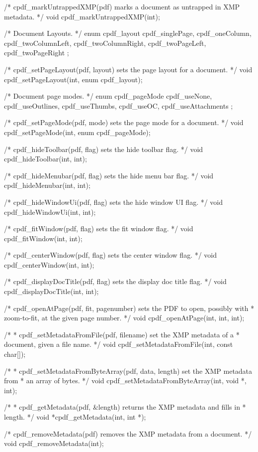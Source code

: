 /* cpdf_markUntrappedXMP(pdf) marks a document as untrapped in XMP metadata. */
void cpdf_markUntrappedXMP(int);

/* Document Layouts. */
enum cpdf_layout {
  cpdf_singlePage,
  cpdf_oneColumn,
  cpdf_twoColumnLeft,
  cpdf_twoColumnRight,
  cpdf_twoPageLeft,
  cpdf_twoPageRight
};

/* cpdf_setPageLayout(pdf, layout) sets the page layout for a document. */
void cpdf_setPageLayout(int, enum cpdf_layout);

/* Document page modes. */
enum cpdf_pageMode {
  cpdf_useNone,
  cpdf_useOutlines,
  cpdf_useThumbs,
  cpdf_useOC,
  cpdf_useAttachments
};

/* cpdf_setPageMode(pdf, mode) sets the page mode for a document. */
void cpdf_setPageMode(int, enum cpdf_pageMode);

/* cpdf_hideToolbar(pdf, flag) sets the hide toolbar flag. */
void cpdf_hideToolbar(int, int);

/* cpdf_hideMenubar(pdf, flag) sets the hide menu bar flag. */
void cpdf_hideMenubar(int, int);

/* cpdf_hideWindowUi(pdf, flag) sets the hide window UI flag. */
void cpdf_hideWindowUi(int, int);

/* cpdf_fitWindow(pdf, flag) sets the fit window flag. */
void cpdf_fitWindow(int, int);

/* cpdf_centerWindow(pdf, flag) sets the center window flag. */
void cpdf_centerWindow(int, int);

/* cpdf_displayDocTitle(pdf, flag) sets the display doc title flag. */
void cpdf_displayDocTitle(int, int);

/* cpdf_openAtPage(pdf, fit, pagenumber) sets the PDF to open, possibly with
 * zoom-to-fit, at the given page number. */
void cpdf_openAtPage(int, int, int);

/*
 * cpdf_setMetadataFromFile(pdf, filename) set the XMP metadata of a
 * document, given a file name.
 */
void cpdf_setMetadataFromFile(int, const char[]);

/*
 * cpdf_setMetadataFromByteArray(pdf, data, length) set the XMP metadata from
 * an array of bytes.
 */
void cpdf_setMetadataFromByteArray(int, void *, int);

/*
 * cpdf_getMetadata(pdf, &length) returns the XMP metadata and fills in
 * length.
 */
void *cpdf_getMetadata(int, int *);

/* cpdf_removeMetadata(pdf) removes the XMP metadata from a document. */
void cpdf_removeMetadata(int);

